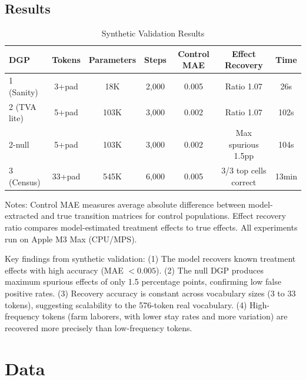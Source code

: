 \documentclass[12pt]{article}
\begin{document}
\subsection{Results}

\begin{table}[H]
\centering
\caption{Synthetic Validation Results}
\label{tab:synthetic}
\begin{threeparttable}
\begin{tabular}{lcccccc}
\toprule
DGP & Tokens & Parameters & Steps & Control MAE & Effect Recovery & Time \\
\midrule
1 (Sanity) & 3+pad & 18K & 2,000 & 0.005 & Ratio 1.07 & 26s \\
2 (TVA lite) & 5+pad & 103K & 3,000 & 0.002 & Ratio 1.07 & 102s \\
2-null & 5+pad & 103K & 3,000 & 0.002 & Max spurious 1.5pp & 104s \\
3 (Census) & 33+pad & 545K & 6,000 & 0.005 & 3/3 top cells correct & 13min \\
\bottomrule
\end{tabular}
\begin{tablenotes}[flushleft]
\small
\item Notes: Control MAE measures average absolute difference between model-extracted and true transition matrices for control populations. Effect recovery ratio compares model-estimated treatment effects to true effects. All experiments run on Apple M3 Max (CPU/MPS).
\end{tablenotes}
\end{threeparttable}
\end{table}

Key findings from synthetic validation: (1) The model recovers known treatment effects with high accuracy (MAE $< 0.005$). (2) The null DGP produces maximum spurious effects of only 1.5 percentage points, confirming low false positive rates. (3) Recovery accuracy is constant across vocabulary sizes (3 to 33 tokens), suggesting scalability to the 576-token real vocabulary. (4) High-frequency tokens (farm laborers, with lower stay rates and more variation) are recovered more precisely than low-frequency tokens.


\section{Data}
\label{sec:data}
\end{document}

